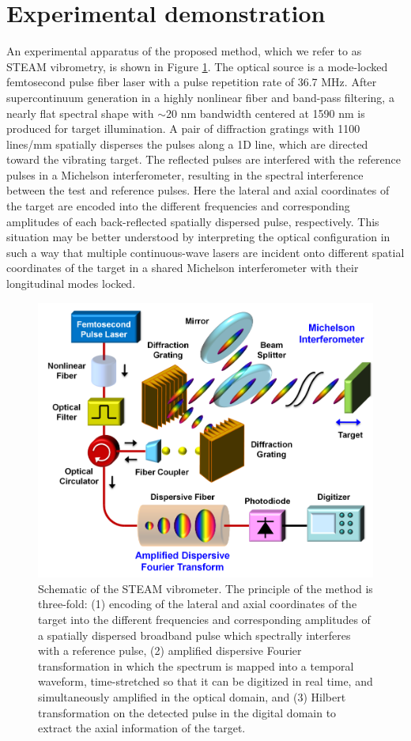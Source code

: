 \section{Experimental demonstration}

An experimental apparatus of the proposed method, which we refer to as STEAM vibrometry, is shown in Figure \ref{fig:APL2011_Figure1}. The optical source is a mode-locked femtosecond pulse fiber laser with a pulse repetition rate of 36.7 MHz. After supercontinuum generation in a highly nonlinear fiber and band-pass filtering, a nearly flat spectral shape with $\sim$20 nm bandwidth centered at 1590 nm is produced for target illumination. A pair of diffraction gratings with 1100 lines/mm spatially disperses the pulses along a 1D line, which are directed toward the vibrating target. The reflected pulses are interfered with the reference pulses in a Michelson interferometer, resulting in the spectral interference between the test and reference pulses. Here the lateral and axial coordinates of the target are encoded into the different frequencies and corresponding amplitudes of each back-reflected spatially dispersed pulse, respectively. This situation may be better understood by interpreting the optical configuration in such a way that multiple continuous-wave lasers are incident onto different spatial coordinates of the target in a shared Michelson interferometer with their longitudinal modes locked.

\begin{figure}[htb!]
\centering
\includegraphics[scale=1]{APL2011/Figure1.png}
\caption{Schematic of the STEAM vibrometer. The principle of the method is three-fold: (1) encoding of the lateral and axial coordinates of the target into the different frequencies and corresponding amplitudes of a spatially dispersed broadband pulse which spectrally interferes with a reference pulse, (2) amplified dispersive Fourier transformation in which the spectrum is mapped into a temporal waveform, time-stretched so that it can be digitized in real time, and simultaneously amplified in the optical domain, and (3) Hilbert transformation on the detected pulse in the digital domain to extract the axial information of the target.}
\label{fig:APL2011_Figure1}
\end{figure}


